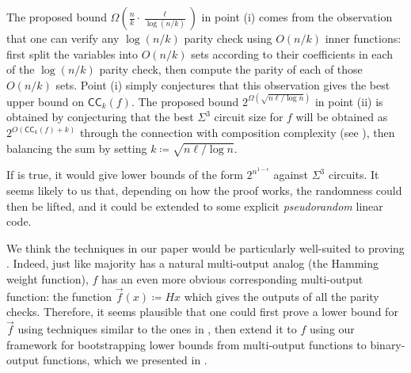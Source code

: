 \documentclass[10pt,a4paper]{article}
\theoremstyle{definition}
\theoremstyle{remark}
\newcommand{\eps}{\epsilon}
\newcommand{\CC}{\mathsf{CC}}
\begin{document}
The proposed bound $\Omega(\frac{n}{k} \cdot \frac{\ell}{\log(n/k)})$ in point (i) comes from the observation that one can verify any $\log(n/k)$ parity check using $O(n/k)$ inner functions: first split the variables into $O(n/k)$ sets according to their coefficients in each of the $\log(n/k)$ parity check, then compute the parity of each of those $O(n/k)$ sets.
Point (i) simply conjectures that this observation gives the best upper bound on $\CC_k(f)$.
The proposed bound $2^{\Omega(\sqrt{n\ell / \log n})}$ in point (ii) is obtained by conjecturing that the best $\Sigma^3$ circuit size for $f$ will be obtained as $2^{O(\CC_k(f) + k)}$ through the connection with composition complexity (see ), then balancing the sum by setting $k \coloneqq \sqrt{n \ell / \log n}$.

If  is true, it would give lower bounds of the form $2^{n^{1-\eps}}$ against $\Sigma^3$ circuits.
It seems likely to us that, depending on how the proof works, the randomness could then be lifted, and it could be extended to some explicit \emph{pseudorandom} linear code.

We think the techniques in our paper would be particularly well-suited to proving .
Indeed, just like majority has a natural multi-output analog (the Hamming weight function), $f$ has an even more obvious corresponding multi-output function: the function $\Vec{f}(x) \coloneqq Hx$ which gives the outputs of all the parity checks.
Therefore, it seems plausible that one could first prove a lower bound for $\Vec{f}$ using techniques similar to the ones in , then extend it to $f$ using our framework for bootstrapping lower bounds from multi-output functions to binary-output functions, which we presented in .
\end{document}
